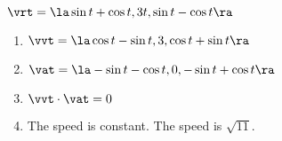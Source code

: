 {$\vrt = \la \sin t + \cos t, 3t, \sin t - \cos t \ra$
}
{\begin{enumerate}
\item $\vvt = \la \cos t - \sin t, 3, \cos t + \sin t \ra$
\item $\vat = \la -\sin t - \cos t, 0, -\sin t + \cos t \ra$
\item $\vvt \cdot \vat = 0$
\item The speed is constant.  The speed is $\sqrt{11}$.
\end{enumerate}
}

